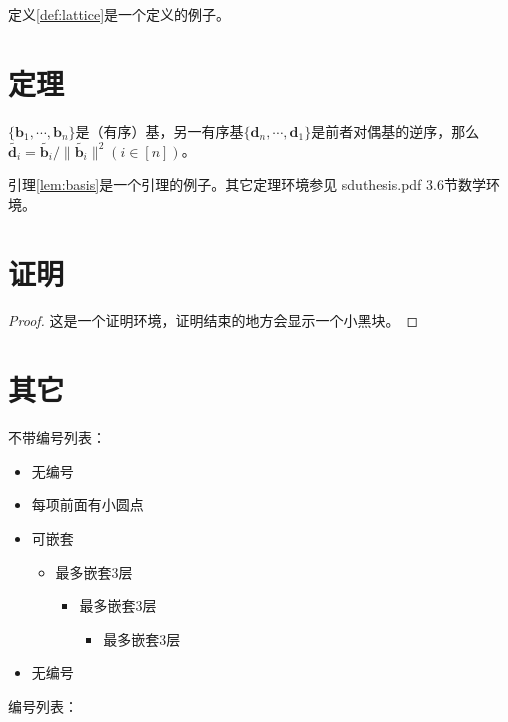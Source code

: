 定义\ref{def:lattice}是一个定义的例子。


\section{定理}

\begin{lemma}
\label{lem:basis}
      $\{\mathbf{b}_1,\cdots,\mathbf{b}_n\}$是（有序）基，另一有序基$\{\mathbf{d}_n,\cdots,\mathbf{d}_1\}$是前者对偶基的逆序，那么$\tilde{\mathbf{d}_i}=\tilde{\mathbf{b}_i}/\lVert\tilde{\mathbf{b}_i}\rVert^2(i\in[n])$。
\end{lemma}

引理\ref{lem:basis}是一个引理的例子。其它定理环境参见 sduthesis.pdf 3.6节数学环境。


\section{证明}

\begin{proof}
这是一个证明环境，证明结束的地方会显示一个小黑块。
\end{proof}


\section{其它}

不带编号列表：

\begin{itemize}
  \item 无编号
  \item 每项前面有小圆点
  \item 可嵌套
  \begin{itemize}
    \item 最多嵌套3层
    \begin{itemize}
      \item 最多嵌套3层
      \begin{itemize}
        \item 最多嵌套3层
      \end{itemize}
    \end{itemize}
  \end{itemize}
  \item 无编号
\end{itemize}

编号列表：

